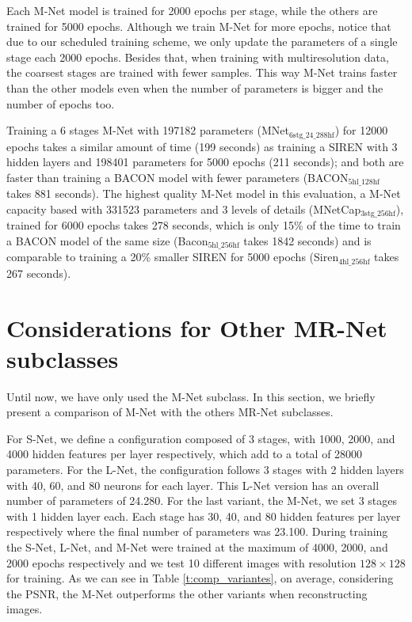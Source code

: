 Each M-Net model is trained for 2000 epochs per stage, while the others are trained for 5000 epochs. Although we train M-Net for more epochs, notice that due to our scheduled training scheme, we only update the parameters of a single stage each 2000 epochs. Besides that, when training with multiresolution data, the coarsest stages are trained with fewer samples. This way M-Net trains faster than the other models even when the number of parameters is bigger and the number of epochs too. 

Training a 6 stages M-Net with 197182 parameters (MNet$_\text{6stg\_24\_288hf}$) for 12000 epochs takes a similar amount of time (199 seconds) as training a SIREN with 3 hidden layers and 198401 parameters for 5000 epochs (211 seconds); and both are faster than training a BACON model with fewer parameters (BACON$_\text{5hl\_128hf}$ takes 881 seconds). The highest quality M-Net model in this evaluation, a M-Net capacity based with 331523 parameters and 3 levels of details (MNetCap$_\text{3stg\_256hf}$), trained for 6000 epochs takes 278 seconds, which is only 15\% of the time to train a BACON model of the same size (Bacon$_\text{5hl\_256hf}$ takes 1842 seconds) and is comparable to training a 20\% smaller SIREN for 5000 epochs (Siren$_\text{4hl\_256hf}$ takes 267 seconds).


\section{Considerations for Other MR-Net subclasses}\label{sec:considerations}

Until now, we have only used the M-Net subclass. In this section, we briefly present a comparison of M-Net with the others MR-Net subclasses.

For S-Net, we define a configuration composed of 3 stages, with 1000, 2000, and 4000 hidden features per layer respectively, which add to a total of 28000 parameters. For the L-Net, the configuration follows 3 stages with 2 hidden layers with 40, 60, and 80 neurons for each layer. This L-Net version has an overall number of parameters of 24.280. For the last variant, the M-Net, we set 3 stages with 1 hidden layer each. Each stage has 30, 40, and 80 hidden features per layer respectively where the final number of parameters was 23.100. During training the S-Net, L-Net, and M-Net were trained at the maximum of 4000, 2000, and 2000 epochs respectively and we test 10 different images with resolution $128 \times 128$ for training. 
As we can see in Table \ref{t:comp_variantes}, on average, considering the PSNR, the M-Net outperforms the other variants when reconstructing images.

